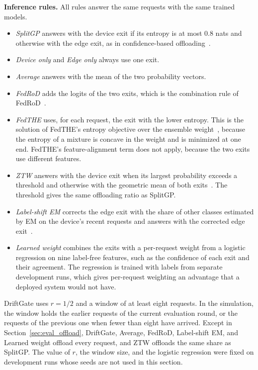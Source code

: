 \textbf{Inference rules.} All rules answer the same requests with the same trained models.
\begin{itemize}
\item \emph{SplitGP} answers with the device exit if its entropy is at most 0.8 nats and otherwise with the edge exit, as in confidence-based offloading~\cite{han2023splitgp}.
\item \emph{Device only} and \emph{Edge only} always use one exit.
\item \emph{Average} answers with the mean of the two probability vectors.
\item \emph{FedRoD} adds the logits of the two exits, which is the combination rule of FedRoD~\cite{chen2022fedrod}.
\item \emph{FedTHE} uses, for each request, the exit with the lower entropy. This is the solution of FedTHE's entropy objective over the ensemble weight~\cite{jiang2023fedthe}, because the entropy of a mixture is concave in the weight and is minimized at one end. FedTHE's feature-alignment term does not apply, because the two exits use different features.
\item \emph{ZTW} answers with the device exit when its largest probability exceeds a threshold and otherwise with the geometric mean of both exits~\cite{wolczyk2021ztw}. The threshold gives the same offloading ratio as SplitGP.
\item \emph{Label-shift EM} corrects the edge exit with the share of other classes estimated by EM on the device's recent requests and answers with the corrected edge exit~\cite{saerens2002adjusting}.
\item \emph{Learned weight} combines the exits with a per-request weight from a logistic regression on nine label-free features, such as the confidence of each exit and their agreement. The regression is trained with labels from separate development runs, which gives per-request weighting an advantage that a deployed system would not have.
\end{itemize}
DriftGate uses $r=1/2$ and a window of at least eight requests. In the simulation, the window holds the earlier requests of the current evaluation round, or the requests of the previous one when fewer than eight have arrived. Except in Section~\ref{sec:eval_offload}, DriftGate, Average, FedRoD, Label-shift EM, and Learned weight offload every request, and ZTW offloads the same share as SplitGP. The value of $r$, the window size, and the logistic regression were fixed on development runs whose seeds are not used in this section.

